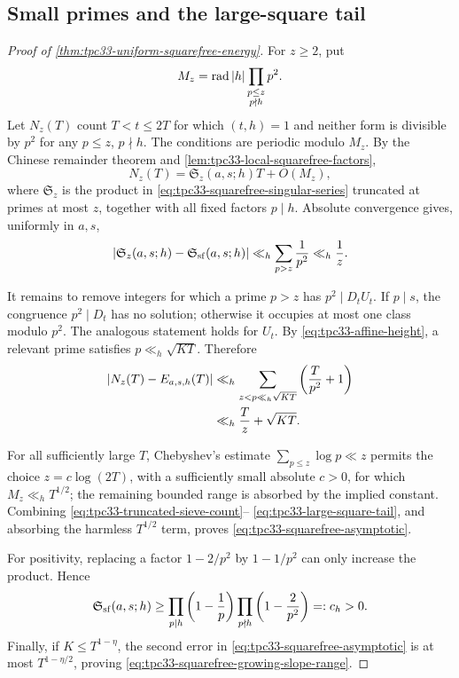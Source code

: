 \subsection{Small primes and the large-square tail}

\begin{proof}[Proof of \cref{thm:tpc33-uniform-squarefree-energy}]
For \(z\ge2\), put
\begin{equation}
 M_z=\operatorname{rad}|h|
 \prod_{\substack{p\le z\\p\nmid h}}p^2.
 \label{eq:tpc33-small-prime-modulus}
\end{equation}
Let \(N_z(T)\) count \(T<t\le2T\) for which \((t,h)=1\) and neither
form is divisible by \(p^2\) for any \(p\le z\), \(p\nmid h\).  The
conditions are periodic modulo \(M_z\).  By the Chinese remainder theorem
and \cref{lem:tpc33-local-squarefree-factors},
\begin{equation}
 N_z(T)=\mathfrak S_z(a,s;h)T+O(M_z),
 \label{eq:tpc33-truncated-sieve-count}
\end{equation}
where \(\mathfrak S_z\) is the product in
\eqref{eq:tpc33-squarefree-singular-series} truncated at primes at most
\(z\), together with all fixed factors \(p\mid h\).  Absolute convergence
gives, uniformly in \(a,s\),
\begin{equation}
 |\mathfrak S_z(a,s;h)-\mathfrak S_{\rm sf}(a,s;h)|
 \ll_h\sum_{p>z}\frac1{p^2}
 \ll_h\frac1z.
 \label{eq:tpc33-singular-series-tail}
\end{equation}

It remains to remove integers for which a prime \(p>z\) has
\(p^2\mid D_tU_t\).  If \(p\mid s\), the congruence \(p^2\mid D_t\)
has no solution; otherwise it occupies at most one class modulo \(p^2\).
The analogous statement holds for \(U_t\).  By
\eqref{eq:tpc33-affine-height}, a relevant prime satisfies
\(p\ll_h\sqrt{KT}\).  Therefore
\begin{align}
 |N_z(T)-E_{a,s,h}(T)|
 &\ll_h
 \sum_{z<p\ll_h\sqrt{KT}}
 \left(\frac{T}{p^2}+1\right)
 \notag\\
 &\ll_h\frac{T}{z}+\sqrt{KT}.
 \label{eq:tpc33-large-square-tail}
\end{align}

For all sufficiently large \(T\), Chebyshev's estimate
\(\sum_{p\le z}\log p\ll z\) permits the choice
\(z=c\log(2T)\), with a sufficiently small absolute \(c>0\), for which
\(M_z\ll_h T^{1/2}\); the remaining bounded range is absorbed by the
implied constant.  Combining
\eqref{eq:tpc33-truncated-sieve-count}--
\eqref{eq:tpc33-large-square-tail}, and absorbing the harmless
\(T^{1/2}\) term, proves \eqref{eq:tpc33-squarefree-asymptotic}.

For positivity, replacing a factor \(1-2/p^2\) by
\(1-1/p^2\) can only increase the product.  Hence
\begin{equation}
 \mathfrak S_{\rm sf}(a,s;h)
 \ge
 \prod_{p\mid h}\left(1-\frac1p\right)
 \prod_{p\nmid h}\left(1-\frac2{p^2}\right)
 =:c_h>0.
 \label{eq:tpc33-squarefree-lower-product}
\end{equation}
Finally, if \(K\le T^{1-\eta}\), the second error in
\eqref{eq:tpc33-squarefree-asymptotic} is at most
\(T^{1-\eta/2}\), proving
\eqref{eq:tpc33-squarefree-growing-slope-range}.
\end{proof}

